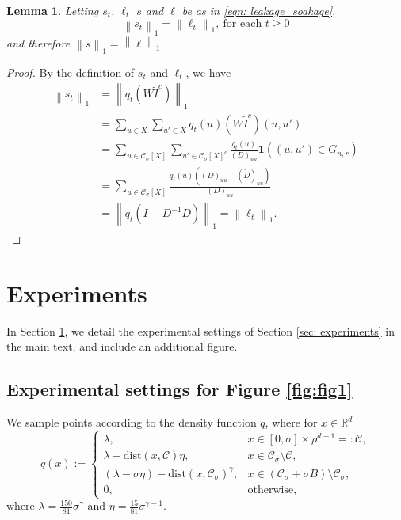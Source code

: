 \documentclass{article}
\newcommand{\Reals}{\mathbb{R}}
\newcommand{\Rd}{\Reals^d}
\newcommand{\norm}[1]{\left\lVert#1\right\rVert}
\newcommand{\1}{\mathbf{1}}
\newcommand{\dist}{\mathrm{dist}}
\newcommand{\Xbf}{X}             %
\newcommand{\Wbf}{W}
\newcommand{\Dbf}{D}
\newcommand{\Ibf}[1]{I_{#1}}
\newcommand{\Cset}{\mathcal{C}}
\newcommand{\Csig}{\Cset_{\sigma}}
\theoremstyle{aldenthm}
\newtheorem{lemma}{Lemma}
\theoremstyle{aldenrmrk}
\begin{document}
\begin{lemma}
	\label{lem: total_leakage_equal_total_soakage}
	Letting $s_t$, $\ell_t$ $s$ and $\ell$ be as in \eqref{eqn: leakage_soakage},
	\begin{equation*}
	\norm{s_t}_1 = \norm{\ell_t}_1,~ \textrm{for each $t \geq 0$}
	\end{equation*}
	and therefore $\norm{s}_1 = \norm{\ell}_1$. 
\end{lemma}
\begin{proof}
	By the definition of $s_t$ and $\ell_t$, we have
	\begin{align*}
	\norm{s_t}_1 & = \norm{q_t (\Wbf \widetilde{I}^c)}_1 \\
	& = \sum_{u \in \Xbf} \sum_{u' \in \Xbf} q_t(u) (\Wbf \widetilde{I}^c)(u, u') \\
	& = \sum_{u \in\Csig[\Xbf]} \sum_{u' \in \Csig[\Xbf]^c} \frac{q_t(u)}{(\Dbf)_{uu}} \1((u,u') \in G_{n,r}) \\
	& = \sum_{u \in \Csig[\Xbf]} \frac{q_t(u) \left((\Dbf)_{uu} - (\widetilde{\Dbf})_{uu} \right)}{(\Dbf)_{uu}} \\
	& = \norm{q_t (\Ibf{} - \Dbf^{-1} \widetilde{\Dbf})}_1 = \norm{\ell_t}_1.
	\end{align*}
\end{proof}

\section{Experiments}
\label{sec: experimental_setting}

In Section \ref{sec: experimental_setting}, we detail the experimental settings of Section \ref{sec: experiments} in the main text, and include an additional figure. 

\subsection{Experimental settings for Figure \ref{fig:fig1}}
We sample points according to the density function $q$, where for $x \in \Rd$
\begin{equation}
q(x) :=
\begin{cases}
\lambda,~ & x \in [0,\sigma] \times \rho^{d-1} =: \Cset, \\
\lambda - \dist(x,\Cset)\eta,~ & x \in \Csig \setminus \Cset, \\
(\lambda - \sigma \eta) - \dist(x,\Csig)^{\gamma}, & x \in (\Csig + \sigma B) \setminus \Csig, \\
0,~ & \textrm{otherwise},
\end{cases}
\end{equation}
where $\lambda = \frac{150}{81} \sigma^{\gamma}$ and $\eta = \frac{15}{81} \sigma^{\gamma - 1}$.
\end{document}

